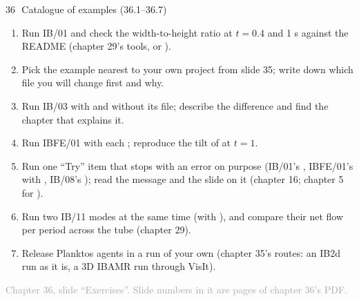 \documentclass[aspectratio=169,11pt]{beamer}
\newcommand{\sourcecredit}[1]{\vfill\begin{flushright}\tiny\textcolor{DarkGray}{#1}\end{flushright}}
\begin{document}
\begin{frame}{36\,\textbullet\ Catalogue of examples (36.1--36.7)}
\label{fr:c36x1}
\footnotesize
\begin{enumerate}\setlength{\itemsep}{2pt}
  \item[36.1] Run IB/01 and check the width-to-height ratio at $t = 0.4$ and 1 s against the README (chapter 29's tools, or ).
  \item[36.2] Pick the example nearest to your own project from slide 35; write down which file you will change first and why.
  \item[36.3] Run IB/03 with and without its  file; describe the difference and find the chapter that explains it.
  \item[36.4] Run IBFE/01 with each ; reproduce the tilt of  at $t = 1$.
  \item[36.5] Run one ``Try'' item that stops with an error on purpose (IB/01's , IBFE/01's  with , IB/08's ); read the message and the slide on it (chapter 16; chapter 5 for ).
  \item[36.6] Run two IB/11 modes at the same time (with ), and compare their net flow per period across the tube (chapter 29).
  \item[36.7] Release Planktos agents in a run of your own (chapter 35's routes: an IB2d run as it is, a 3D IBAMR run through VisIt).
\end{enumerate}
\sourcecredit{Chapter 36, slide ``Exercises''. Slide numbers in it are pages of chapter 36's PDF.}
\end{frame}
\end{document}
